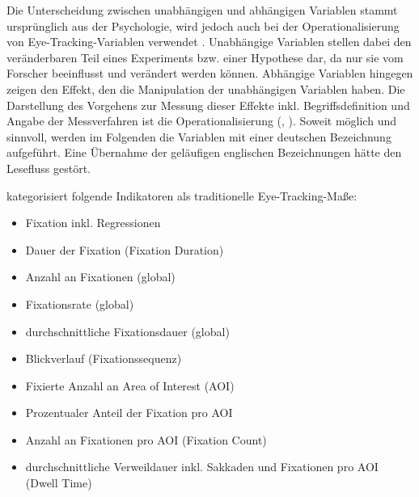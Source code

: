 \begin{sloppypar}
Die Unterscheidung zwischen unabhängigen und abhängigen Variablen stammt ursprünglich aus der Psychologie, wird jedoch auch bei der Operationalisierung von Eye-Tracking-Variablen verwendet \citep[6]{huang_visual_2014}. Unabhängige Variablen stellen dabei den veränderbaren Teil eines Experiments bzw. einer Hypothese dar, da nur sie vom Forscher beeinflusst und verändert werden können. Abhängige Variablen hingegen zeigen den Effekt, den die Manipulation der unabhängigen Variablen haben. Die Darstellung des Vorgehens zur Messung dieser Effekte inkl. Begriffsdefinition und Angabe der Messverfahren ist die Operationalisierung (\cite[81]{albert_empirisches_2014}, \cite[125\psqq]{aeppli_empirisches_2016}). Soweit möglich und sinnvoll, werden im Folgenden die Variablen mit einer deutschen Bezeichnung aufgeführt. Eine Übernahme der geläufigen englischen Bezeichnungen hätte den Lesefluss gestört. 
\end{sloppypar}

\citet[218]{duchowski_eye_2017} kategorisiert folgende Indikatoren als traditionelle Eye-Tracking-Maße:

\begin{itemize}
    \item Fixation inkl. Regressionen
    \item Dauer der Fixation (Fixation Duration)
    \item Anzahl an Fixationen (global)
    \item Fixationsrate (global)
    \item durchschnittliche Fixationsdauer (global)
    \item Blickverlauf (Fixationssequenz)
    \item Fixierte Anzahl an Area of Interest (AOI)
    \item Prozentualer Anteil der Fixation pro AOI
    \item Anzahl an Fixationen pro AOI (Fixation Count)
    \item durchschnittliche Verweildauer inkl. Sakkaden und Fixationen pro AOI (Dwell Time)
\end{itemize}


